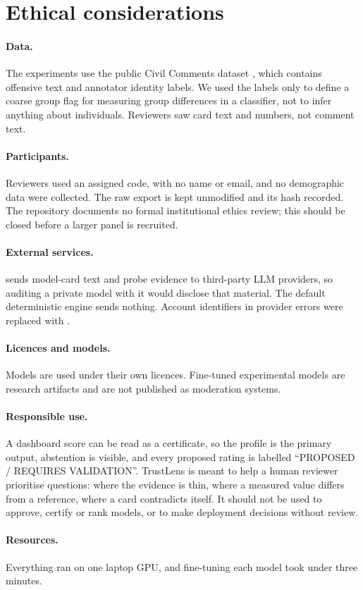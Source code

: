 \section{Ethical considerations}
\paragraph{Data.} The experiments use the public Civil Comments dataset \cite{borkan2019}, which contains offensive text and annotator identity labels. We used the labels only to define a coarse group flag for measuring group differences in a classifier, not to infer anything about individuals. Reviewers saw card text and numbers, not comment text.

\paragraph{Participants.} Reviewers used an assigned code, with no name or email, and no demographic data were collected. The raw export is kept unmodified and its hash recorded. The repository documents no formal institutional ethics review; this should be closed before a larger panel is recruited.

\paragraph{External services.}  sends model-card text and probe evidence to third-party LLM providers, so auditing a private model with it would disclose that material. The default deterministic engine sends nothing. Account identifiers in provider errors were replaced with .

\paragraph{Licences and models.} Models are used under their own licences. Fine-tuned experimental models are research artifacts and are not published as moderation systems.

\paragraph{Responsible use.} A dashboard score can be read as a certificate, so the profile is the primary output, abstention is visible, and every proposed rating is labelled ``PROPOSED / REQUIRES VALIDATION''. TrustLens is meant to help a human reviewer prioritise questions: where the evidence is thin, where a measured value differs from a reference, where a card contradicts itself. It should not be used to approve, certify or rank models, or to make deployment decisions without review.

\paragraph{Resources.} Everything ran on one laptop GPU, and fine-tuning each model took under three minutes.
